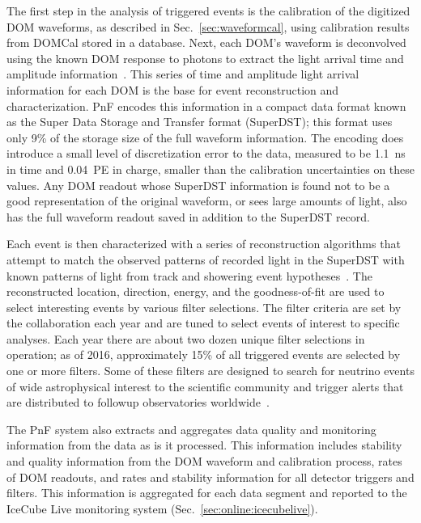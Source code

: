 The first step in the analysis of triggered events is the calibration of
the digitized DOM waveforms, as described in Sec.~\ref{sec:waveformcal}, using
calibration results from DOMCal stored in a database.  Next, each
DOM's waveform is deconvolved using the known DOM response to photons to
extract the light arrival time and amplitude information~\cite{IC3:ereco}.
This series of time and amplitude light arrival information for each DOM is
the base for event reconstruction and characterization.  PnF encodes this
information in a compact data format known as the Super Data
Storage and Transfer format (SuperDST); this format uses only 9\% of the storage
size of the full waveform information.  The encoding does introduce a
small level of discretization error to the data, measured to be 1.1~ns in time and
0.04~PE in charge, smaller than the calibration uncertainties on these
values.  Any DOM readout whose SuperDST information is found not to be a
good representation of the original waveform, or sees large amounts of
light, also has the full waveform readout saved in addition to the
SuperDST record.


Each event is then characterized with a series of reconstruction
algorithms that attempt to match the observed patterns of recorded light in
the SuperDST with known patterns of light from track and showering event
hypotheses~\cite{IC3:ereco}.  The reconstructed location, direction,
energy, and the goodness-of-fit are used to select interesting events by various
filter selections.  The filter criteria are set by the collaboration
each year and are tuned to select events of interest to specific
analyses.  Each year there are about two dozen unique filter selections in
operation; as of 2016, approximately 15\% of all triggered events are
selected by one or more filters.  Some of these filters are designed to search for
neutrino events of wide astrophysical interest to the scientific community
and trigger alerts that are distributed to followup observatories
worldwide~\cite{Abbasi:2011ja,Aartsen:2015trq}.

The PnF system also extracts and aggregates data quality and monitoring
information from the data as is it processed.  This information includes
stability and quality information from the DOM waveform and calibration
process, rates of DOM readouts, and rates and 
stability information for all detector triggers and filters.  This
information is aggregated for each data segment and reported to the IceCube
Live monitoring system (Sec.~\ref{sec:online:icecubelive}).

